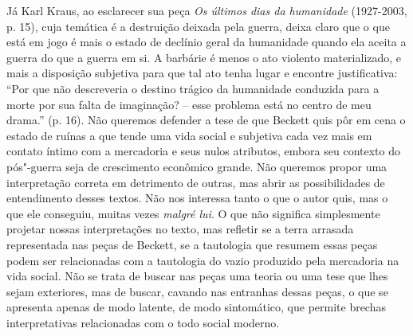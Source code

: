 Já Karl Kraus, ao esclarecer sua peça \emph{Os últimos dias da
humanidade} (1927-2003, p. 15), cuja temática é a destruição deixada
pela guerra, deixa claro que o que está em jogo é mais o estado de
declínio geral da humanidade quando ela aceita a guerra do que a guerra
em si. A barbárie é menos o ato violento materializado, e mais a
disposição subjetiva para que tal ato tenha lugar e encontre
justificativa: ``Por que não descreveria o destino trágico da humanidade
conduzida para a morte por sua falta de imaginação? -- esse problema
está no centro de meu drama.'' (p. 16). Não queremos defender a tese de
que Beckett quis pôr em cena o estado de ruínas a que tende uma vida
social e subjetiva cada vez mais em contato íntimo com a mercadoria e
seus nulos atributos, embora seu contexto do pós"-guerra seja de
crescimento econômico grande. Não queremos propor uma interpretação
correta em detrimento de outras, mas abrir as possibilidades de
entendimento desses textos. Não nos interessa tanto o que o autor quis,
mas o que ele conseguiu, muitas vezes \emph{malgré lui}. O que não
significa simplesmente projetar nossas interpretações no texto, mas
refletir se a terra arrasada representada nas peças de Beckett, se a
tautologia que resumem essas peças podem ser relacionadas com a
tautologia do vazio produzido pela mercadoria na vida social. Não se
trata de buscar nas peças uma teoria ou uma tese que lhes sejam
exteriores, mas de buscar, cavando nas entranhas dessas peças, o que se
apresenta apenas de modo latente, de modo sintomático, que permite
brechas interpretativas relacionadas com o todo social moderno.

